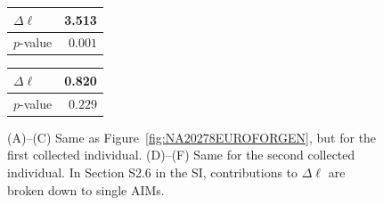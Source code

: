 \documentclass[12pt]{article}
\theoremstyle{definition}
\begin{document}
\begin{figure}[htb]
\noindent    
 {\color{blue}
\begin{tabular}{|l|r|}\hline
$\Delta\ell$ & 3.513 \\ \hline
$p$-value & $0.001$ \\ \hline
\end{tabular}}
\hspace{6cm}
{\color{blue}
\begin{tabular}{|l|r|}\hline
$\Delta\ell$ & 0.820 \\ \hline
$p$-value & $0.229$ \\ \hline
\end{tabular}}


    
  \caption{\label{fig:ind83} (A)--(C) Same as Figure~\ref{fig:NA20278EUROFORGEN}, but for the first collected individual. (D)--(F) Same for the second collected individual. In Section S2.6 in the SI, contributions to $\Delta\ell$ are broken down to single AIMs.}
\end{figure}
\end{document}
